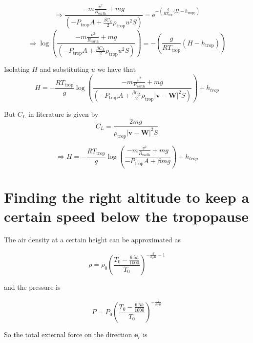 \documentclass{article}
\renewcommand{\vec}[1]{\boldsymbol{#1}}
\begin{document}
\begin{equation}
  \Rightarrow \frac{-m\frac{v^2}{R_{\text{earth}}} +mg}{\left(-  P_{\text{trop}}A +\frac{\beta C_L}{2} \rho_{\text{trop}} u^2S\right)}=  \mathrm{e}^{-\left( \frac{g}{RT_{\text{trop}}}(H-h_{\text{trop})} \right)}    
\end{equation}
\begin{equation}
  \Rightarrow \log \left(\frac{-m\frac{v^2}{R_{\text{earth}}} +mg}{\left(-  P_{\text{trop}}A +\frac{\beta C_L}{2} \rho_{\text{trop}} u^2S\right)}\right)=  -\left( \frac{g}{RT_{\text{trop}}}(H-h_{\text{trop}}) \right)    
\end{equation}

Isolating $H$ and substituting $u$ we have that
\begin{equation}
    H= - \frac{RT_{\text{trop}}}{g}\log \left(\frac{-m\frac{v^2}{R_{\text{earth}}} +mg}{\left(-  P_{\text{trop}}A +\frac{\beta C_L}{2} \rho_{\text{trop}} |\vec v-\vec W|^2S\right)}\right)+h_{trop}
\end{equation}

 But $C_L$ in literature is given by
\begin{equation}
    C_L= \frac{2mg}{\rho_{\text{trop}} |\vec v-\vec W|^2S}
\end{equation}

\begin{equation}
    \Rightarrow H= - \frac{RT_{\text{trop}}}{g}\log \left(\frac{-m\frac{v^2}{R_{\text{earth}}} +mg}{-  P_{\text{trop}}A +\beta mg }\right)+h_{trop}
\end{equation}

\section{Finding the right altitude to keep a certain speed below the tropopause}

The air density at a certain height can be approximated as

\begin{equation}
    \rho= \rho_0 \left(\frac{T_0-\frac{6.5h}{1000}}{T_0}\right)^{-\frac{g}{k_TR}-1}
\end{equation}

and the pressure is 

\begin{equation}
    P=P_0\left(\frac{T_0-\frac{6.5h}{1000}}{T_0}\right)^{-\frac{g}{k_TR}}
\end{equation}

So the total external force on the direction $\vec{e}_r$ is 
\end{document}
